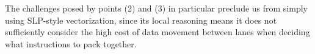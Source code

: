 The challenges posed by points (2) and (3) in particular preclude us from simply using SLP-style vectorization, since its local reasoning means it does not sufficiently consider the high cost of data movement between lanes when deciding what instructions to pack together. %
